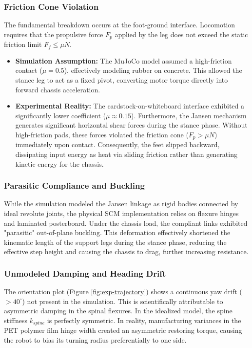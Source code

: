 \documentclass[11pt, a4paper]{article}
\begin{document}
\subsubsection{Friction Cone Violation}
The fundamental breakdown occurs at the foot-ground interface. Locomotion requires that the propulsive force $F_p$ applied by the leg does not exceed the static friction limit $F_f \le \mu N$.
\begin{itemize}
    \item \textbf{Simulation Assumption:} The MuJoCo model assumed a high-friction contact ($\mu=0.5$), effectively modeling rubber on concrete. This allowed the stance leg to act as a fixed pivot, converting motor torque directly into forward chassis acceleration.
    \item \textbf{Experimental Reality:} The cardstock-on-whiteboard interface exhibited a significantly lower coefficient ($\mu \approx 0.15$). Furthermore, the Jansen mechanism generates significant horizontal shear forces during the stance phase. Without high-friction pads, these forces violated the friction cone ($F_p > \mu N$) immediately upon contact. Consequently, the feet slipped backward, dissipating input energy as heat via sliding friction rather than generating kinetic energy for the chassis.
\end{itemize}

\subsubsection{Parasitic Compliance and Buckling}
While the simulation modeled the Jansen linkage as rigid bodies connected by ideal revolute joints, the physical SCM implementation relies on flexure hinges and laminated posterboard. Under the chassis load, the compliant links exhibited "parasitic" out-of-plane buckling. This deformation effectively shortened the kinematic length of the support legs during the stance phase, reducing the effective step height and causing the chassis to drag, further increasing resistance.

\subsubsection{Unmodeled Damping and Heading Drift}
The orientation plot (Figure \ref{fig:exp-trajectory}) shows a continuous yaw drift ($>40^\circ$) not present in the simulation. This is scientifically attributable to asymmetric damping in the spinal flexures. In the idealized model, the spine stiffness $k_{spine}$ is perfectly symmetric. In reality, manufacturing variances in the PET polymer film hinge width created an asymmetric restoring torque, causing the robot to bias its turning radius preferentially to one side.
\end{document}

